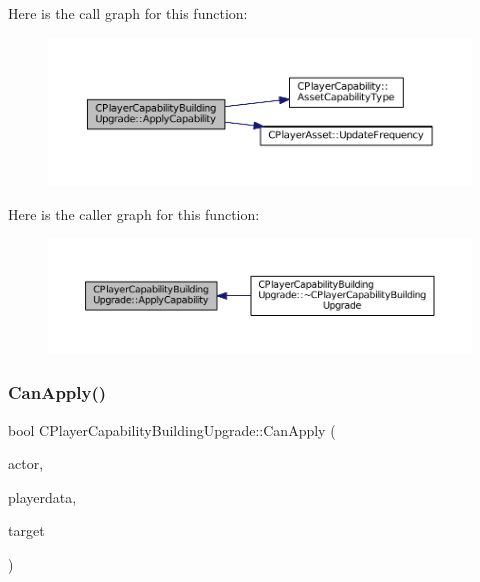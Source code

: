 Here is the call graph for this function\+:\nopagebreak
\begin{figure}[H]
\begin{center}
\leavevmode
\includegraphics[width=350pt]{classCPlayerCapabilityBuildingUpgrade_a5e71446b74307f31ce6d6e9bbfd9a681_cgraph}
\end{center}
\end{figure}
Here is the caller graph for this function\+:\nopagebreak
\begin{figure}[H]
\begin{center}
\leavevmode
\includegraphics[width=350pt]{classCPlayerCapabilityBuildingUpgrade_a5e71446b74307f31ce6d6e9bbfd9a681_icgraph}
\end{center}
\end{figure}
\hypertarget{classCPlayerCapabilityBuildingUpgrade_a22de7902bcf6406a3b3a7c51e5c56f35}{}\label{classCPlayerCapabilityBuildingUpgrade_a22de7902bcf6406a3b3a7c51e5c56f35} 
\subsubsection{\texorpdfstring{Can\+Apply()}{CanApply()}}
{\footnotesize\ttfamily bool C\+Player\+Capability\+Building\+Upgrade\+::\+Can\+Apply (\begin{DoxyParamCaption}\item[{std\+::shared\+\_\+ptr$<$ \hyperlink{classCPlayerAsset}{C\+Player\+Asset} $>$}]{actor,  }\item[{std\+::shared\+\_\+ptr$<$ \hyperlink{classCPlayerData}{C\+Player\+Data} $>$}]{playerdata,  }\item[{std\+::shared\+\_\+ptr$<$ \hyperlink{classCPlayerAsset}{C\+Player\+Asset} $>$}]{target }\end{DoxyParamCaption})\hspace{0.3cm}{\ttfamily [virtual]}}



